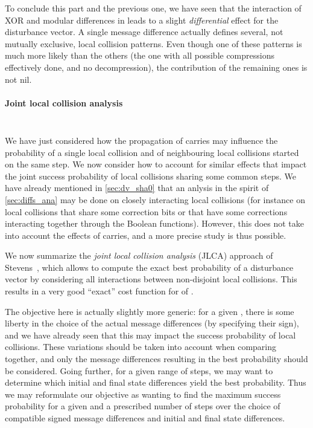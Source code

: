 \medskip

To conclude this part and the previous one, we have seen that the interaction of XOR and modular differences in \sha leads to a slight \emph{differential} effect for the disturbance vector. A single
message difference actually defines several, not mutually exclusive, local collision patterns. Even though one of these patterns is much more likely than the others (\ie the one with all possible compressions
effectively done, and no decompression), the contribution of the remaining ones is not nil.

\paragraph{Joint local collision analysis}
$\phantom{bouh}$

\medskip

\noindent
We have just considered how the propagation of carries may influence the probability of a single local collision and of neighbouring local collisions started on the same step. We now consider how to account for similar effects
that impact the joint success probability of local collisions sharing some common steps. We have already mentioned in \autoref{sec:dv_sha0} that an anlysis in the spirit of \autoref{sec:diffs_ana} may be done
on closely interacting local collisions (for instance on local collisions that share some correction bits or that have some corrections interacting together through the Boolean functions).
However, this does not take into account the effects of carries, and a more precise study is thus
possible.

We now summarize the \emph{joint local collision analysis} (JLCA) approach of Stevens~\cite{DBLP:conf/eurocrypt/Stevens13,phdstevens}, which allows to compute the exact best probability of a disturbance vector
by considering all interactions between non-disjoint local collisions. This results in a very good ``exact'' cost function for \dvs of \shaone.

\medskip

The objective here is actually slightly more generic: for a given \dv, there is some liberty in the choice of the actual message differences (\eg by specifying their sign), and we have already seen that this
may impact the success probability of local collisions. These variations should be taken into account when comparing \dvs together, and only the message differences resulting in the best probability should
be considered. Going further, for a given range of steps, we may want to determine which initial and final state differences yield the best probability.
Thus we may reformulate our objective as wanting to find the maximum success probability for a given \dv and a prescribed number of steps over the choice of compatible signed message differences and initial
and final state differences.

